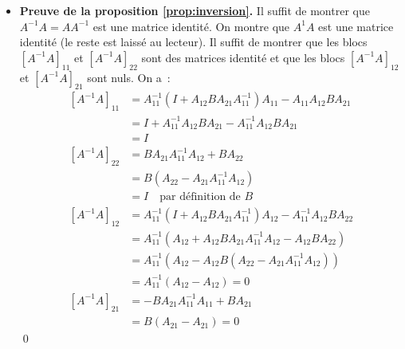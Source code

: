 \documentclass[10pt]{beamer}
\theoremstyle{plain}
\begin{document}
\begin{notes}

  \begin{itemize}

  \item \textbf{Preuve de la proposition \ref{prop:inversion}.} Il suffit de montrer que $A^{-1}A = AA^{-1}$ est une matrice identité. On montre que $A^{1}A$ est une matrice identité (le reste est laissé au lecteur). Il suffit de montrer que les blocs $\left[ A^{-1}A \right]_{11}$ et $\left[ A^{-1}A \right]_{22}$ sont des matrices identité et que les blocs $\left[ A^{-1}A \right]_{12}$ et $\left[ A^{-1}A \right]_{21}$ sont nuls. On a~:
    \[
      \begin{split}
        \left[A^{-1}A\right]_{11} &= A_{11}^{-1}\left( I + A_{12}BA_{21}A_{11}^{-1} \right)A_{11}-A_{11}A_{12}BA_{21}\\
                                  &= I + A_{11}^{-1}A_{12}BA_{21}-A_{11}^{-1}A_{12}BA_{21}\\
                                  &= I\\
        \left[ A^{-1}A \right]_{22} &= BA_{21}A_{11}^{-1}A_{12}+BA_{22}\\
                                  &= B\left( A_{22}- A_{21}A_{11}^{-1}A_{12}\right)\\
                                  &= I\quad\text{par définition de }B\\
        \left[ A^{-1}A \right]_{12} &= A_{11}^{-1}\left( I + A_{12}BA_{21}A_{11}^{-1} \right)A_{12} - A_{11}^{-1}A_{12}BA_{22}\\
                                  &= A_{11}^{-1}\left( A_{12} + A_{12}BA_{21}A_{11}^{-1}A_{12} - A_{12} B A_{22}  \right)\\
                                  &= A_{11}^{-1}\left( A_{12} - A_{12}B \left(A_{22}- A_{21}A_{11}^{-1}A_{12} \right) \right)\\
                                  &= A_{11}^{-1}\left( A_{12} - A_{12}\right) = 0\\
        \left[A^{-1}A\right]_{21} &= -BA_{21}A_{11}^{-1}A_{11}+BA_{21}\\
                                  &= B\left( A_{21}- A_{21}\right) = 0
      \end{split}
    \]
    \qed
  \end{itemize}

\end{notes}
\end{document}
